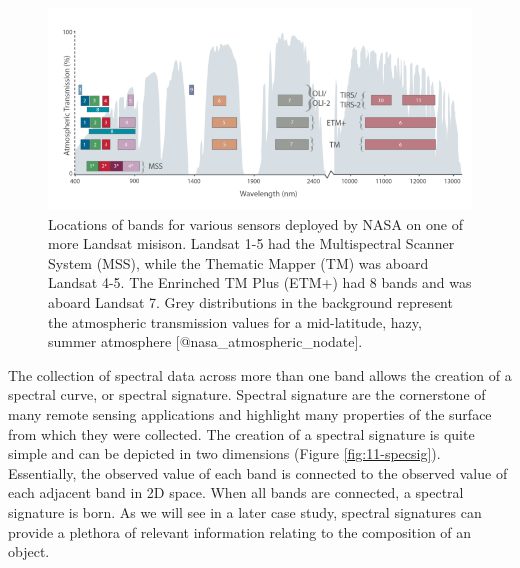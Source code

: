 \documentclass[
]{book}
\begin{document}
\begin{figure}
\includegraphics[width=1\linewidth]{images/11-landsat-bands} \caption{Locations of bands for various sensors deployed by NASA on one of more Landsat misison. Landsat 1-5 had the Multispectral Scanner System (MSS), while the Thematic Mapper (TM) was aboard Landsat 4-5. The Enrinched TM Plus (ETM+) had 8 bands and was aboard Landsat 7. Grey distributions in the background represent the atmospheric transmission values for a mid-latitude, hazy, summer atmosphere [@nasa_atmospheric_nodate].}\label{fig:11-landsat-bands}
\end{figure}

The collection of spectral data across more than one band allows the
creation of a spectral curve, or spectral signature. Spectral signature
are the cornerstone of many remote sensing applications and highlight
many properties of the surface from which they were collected. The
creation of a spectral signature is quite simple and can be depicted in
two dimensions (Figure \ref{fig:11-specsig}). Essentially, the observed
value of each band is connected to the observed value of each adjacent
band in 2D space. When all bands are connected, a spectral signature is
born. As we will see in a later case study, spectral signatures can
provide a plethora of relevant information relating to the composition
of an object.
\end{document}
